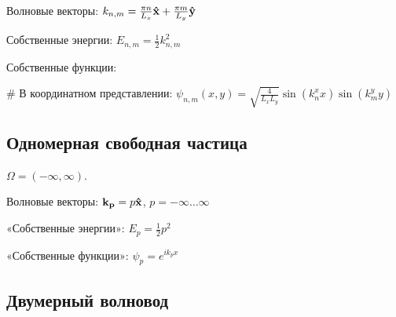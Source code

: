 Волновые векторы: $k_{n, m} = \frac{\pi n}{L_x} \vb{\hat{x}} + \frac{\pi m}{L_y} \vb{\hat{y}}$

Собственные энергии: $E_{n, m} = \frac{1}{2} k_{n, m}^2$

Собственные функции: 
\begin{ilist}
# В координатном представлении: $\psi_{n, m}(x, y) = \sqrt{\frac{4}{L_x L_y}} \sin(k^x_n x) \sin(k^y_m y)$
\end{ilist}



\subsection{Одномерная свободная частица}
$\Omega = (-\infty, \infty)$. 

Волновые векторы: $\vb{k_{p}} = p \vb{\hat{x}}$, $p = -\infty \dots \infty$

«Собственные энергии»: $E_p = \frac{1}{2} p^2$

«Собственные функции»: $\psi_p = e^{i k_p x}$


\subsection{Двумерный волновод}
